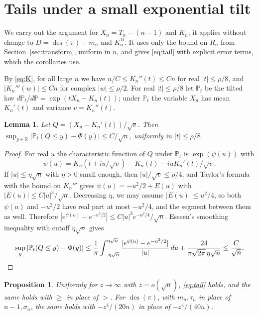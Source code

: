 \documentclass[11pt]{amsart}
\newtheorem{lemma}[theorem]{Lemma}
\newtheorem{proposition}[theorem]{Proposition}
\theoremstyle{remark}
\newcommand{\des}{\operatorname{des}}
\renewcommand{\P}{\mathbb{P}}
\newcommand{\R}{\mathbb{R}}
\begin{document}
\section{Tails under a small exponential tilt}\label{sec:tails}

We carry out the argument for $X_n=T_n-(n-1)$ and $K_n$; it applies without change to $D=\des(\pi)-m_n$ and $K_n^D$. It uses only the bound on $R_n$ from Section~\ref{sec:transform}, uniform in $n$, and gives \eqref{eq:tail} with explicit error terms, which the corollaries use.

By \eqref{eq:K}, for all large $n$ we have $n/C\le K_n''(t)\le Cn$ for real $|t|\le\rho/8$, and $|K_n'''(w)|\le Cn$ for complex $|w|\le\rho/2$. For real $|t|\le\rho/8$ let $\P_t$ be the tilted law $d\P_t/d\P=\exp(tX_n-K_n(t))$; under $\P_t$ the variable $X_n$ has mean $K_n'(t)$ and variance $v=K_n''(t)$.

\begin{lemma}\label{lem:tilt}
Let $Q=(X_n-K_n'(t))/\sqrt v$. Then $\sup_{y\in\R}|\P_t(Q\le y)-\Phi(y)|\le C/\sqrt n$, uniformly in $|t|\le\rho/8$.
\end{lemma}

\begin{proof}
For real $u$ the characteristic function of $Q$ under $\P_t$ is $\exp(\psi(u))$ with
\[
\psi(u)=K_n(t+iu/\sqrt v)-K_n(t)-iuK_n'(t)/\sqrt v.
\]
If $|u|\le\eta\sqrt n$ with $\eta>0$ small enough, then $|u|/\sqrt v\le\rho/4$, and Taylor's formula with the bound on $K_n'''$ gives $\psi(u)=-u^2/2+E(u)$ with $|E(u)|\le C|u|^3/\sqrt n$. Decreasing $\eta$, we may assume $|E(u)|\le u^2/4$, so both $\psi(u)$ and $-u^2/2$ have real part at most $-u^2/4$, and the segment between them as well. Therefore $|e^{\psi(u)}-e^{-u^2/2}|\le C|u|^3e^{-u^2/4}/\sqrt n$. Esseen's smoothing inequality \cite[Section~XVI.3, Lemma~2]{Fel71} with cutoff $\eta\sqrt n$ gives
\[
\sup_y|\P_t(Q\le y)-\Phi(y)|\le\frac1\pi\int_{-\eta\sqrt n}^{\eta\sqrt n}\frac{|e^{\psi(u)}-e^{-u^2/2}|}{|u|}\,du+\frac{24}{\pi\sqrt{2\pi}\,\eta\sqrt n}\le\frac C{\sqrt n}.\qedhere
\]
\end{proof}

\begin{proposition}\label{prop:tail}
Uniformly for $z\to\infty$ with $z=o(\sqrt n)$, \eqref{eq:tail} holds, and the same holds with $\ge$ in place of $>$. For $\des(\pi)$, with $m_n,\tau_n$ in place of $n-1,\sigma_n$, the same holds with $-z^4/(20n)$ in place of $-z^4/(40n)$.
\end{proposition}
\end{document}
